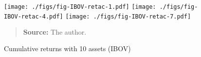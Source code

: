 \documentclass[12pt,oneside,a4paper]{memoir}
\begin{document}




\clearpage

\begin{figure}[htpb]
\centering
\footnotesize
\caption{Cumulative returns with 10 assets (IBOV)}
\label{fig:ibov:ret:10a}
\texttt{[image: ./figs/fig-IBOV-retac-1.pdf]}
\texttt{[image: ./figs/fig-IBOV-retac-4.pdf]}
\texttt{[image: ./figs/fig-IBOV-retac-7.pdf]}
\begin{quote}
\textbf{Source:} The author.
\end{quote}
\end{figure}
\end{document}
